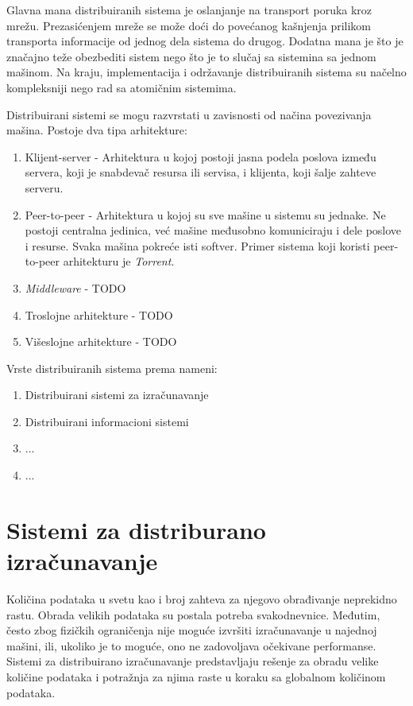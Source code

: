 \documentclass[12pt,oneside]{memoir}
\begin{document}
Glavna mana distribuiranih sistema je oslanjanje na transport poruka kroz mrežu. Prezasićenjem mreže se može doći do povećanog kašnjenja prilikom transporta informacije od jednog dela sistema do drugog. Dodatna mana je što je značajno teže obezbediti sistem nego što je to slučaj sa sistemina sa jednom mašinom. Na kraju, implementacija i održavanje distribuiranih sistema su načelno kompleksniji nego rad sa atomičnim sistemima.

Distribuirani sistemi se mogu razvrstati u zavisnosti od načina povezivanja mašina. Postoje dva tipa arhitekture:
\begin{enumerate}
\item Klijent-server - Arhitektura u kojoj postoji jasna podela poslova između servera, koji je snabdevač resursa ili servisa, i klijenta, koji šalje zahteve serveru.
\item Peer-to-peer - Arhitektura u kojoj su sve mašine u sistemu su jednake. Ne postoji centralna jedinica, već mašine međusobno komuniciraju i dele poslove i resurse. Svaka mašina pokreće isti softver. Primer sistema koji koristi peer-to-peer arhitekturu je \emph{Torrent}.
\item \emph{Middleware} - TODO
\item Troslojne arhitekture - TODO
\item Višeslojne arhitekture - TODO
\end{enumerate}

Vrste distribuiranih sistema prema nameni:
\begin{enumerate}
\item Distribuirani sistemi za izračunavanje
\item Distribuirani informacioni sistemi
\item ...
\item ...
\end{enumerate}

\section{Sistemi za distriburano izračunavanje}

Količina podataka u svetu kao i broj zahteva za njegovo obrađivanje neprekidno rastu. Obrada velikih podataka su postala potreba svakodnevnice. Međutim, često zbog fizičkih ograničenja nije moguće izvršiti izračunavanje u najednoj mašini, ili, ukoliko je to moguće, ono ne zadovoljava očekivane performanse. Sistemi za distribuirano izračunavanje predstavljaju rešenje za obradu velike količine podataka i potražnja za njima raste u koraku sa globalnom količinom podataka.
\end{document}
